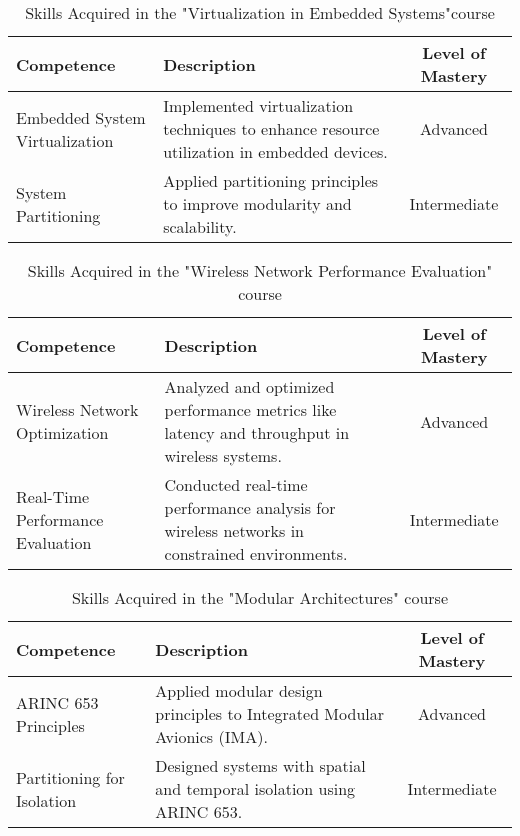 \begin{table}[H]
    \centering
    \renewcommand{\arraystretch}{1.5} %
    \begin{tabular}{|p{3.5cm}|p{8cm}|c|}
        \hline
        \rowcolor[gray]{0.8}
        \textbf{Competence} & \textbf{Description} & \textbf{Level of Mastery} \\
        \hline
        Embedded System Virtualization & Implemented virtualization techniques to enhance resource utilization in embedded devices. & Advanced \\ \hline
        System Partitioning & Applied partitioning principles to improve modularity and scalability. & Intermediate \\ \hline
    \end{tabular}
\caption{Skills Acquired in the "Virtualization in Embedded Systems"course}
\end{table}
    
\begin{table}[H]
    \centering
    \renewcommand{\arraystretch}{1.5} %
    \begin{tabular}{|p{3.5cm}|p{8cm}|c|}
        \hline
        \rowcolor[gray]{0.8}
        \textbf{Competence} & \textbf{Description} & \textbf{Level of Mastery} \\
        \hline
        Wireless Network Optimization & Analyzed and optimized performance metrics like latency and throughput in wireless systems. & Advanced \\ \hline
        Real-Time Performance Evaluation & Conducted real-time performance analysis for wireless networks in constrained environments. & Intermediate \\ \hline
    \end{tabular}
\caption{Skills Acquired in the "Wireless Network Performance Evaluation" course}
\end{table}
    
\begin{table}[H]
    \centering
    \renewcommand{\arraystretch}{1.5} %
    \begin{tabular}{|p{3.5cm}|p{8cm}|c|}
        \hline
        \rowcolor[gray]{0.8}
        \textbf{Competence} & \textbf{Description} & \textbf{Level of Mastery} \\
        \hline
        ARINC 653 Principles & Applied modular design principles to Integrated Modular Avionics (IMA). & Advanced \\ \hline
        Partitioning for Isolation & Designed systems with spatial and temporal isolation using ARINC 653. & Intermediate \\ \hline
    \end{tabular}
\caption{Skills Acquired in the "Modular Architectures" course}
\end{table}
    
